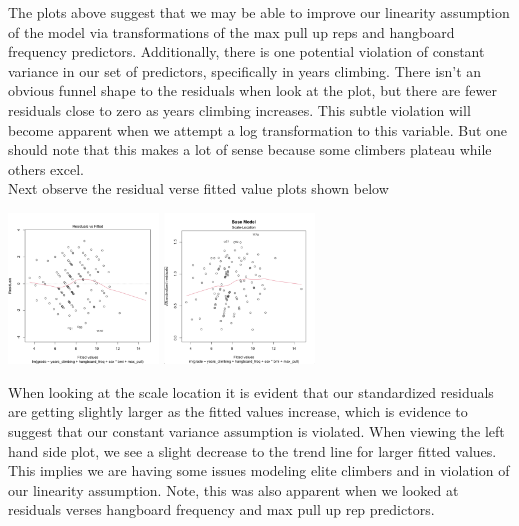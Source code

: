 \documentclass[11pt]{amsart}
\begin{document}
The plots above suggest that we may be able to improve our linearity assumption of the model via transformations of the max pull up reps and hangboard frequency predictors.
Additionally, there is one potential violation of constant variance in our set of predictors, specifically in years climbing.
There isn't an obvious funnel shape to the residuals when look at the plot, but there are fewer residuals close to zero as years climbing increases. This subtle violation will become apparent when we attempt a log transformation to this variable.
But one should note that this makes a lot of sense because some climbers plateau while others excel.\\

Next observe the residual verse fitted value plots shown below\\

\begin{center}
\includegraphics[width=0.3\textwidth]{base_resid_fitted}
\includegraphics[width=0.3\textwidth]{base_scale}
\end{center}

When looking at the scale location it is evident that our standardized residuals are getting slightly larger as the fitted values increase, which is evidence to suggest that our constant variance assumption is violated.
When viewing the left hand side plot, we see a slight decrease to the trend line for larger fitted values.
This implies we are having some issues modeling elite climbers and in violation of our linearity assumption.
Note, this was also apparent when we looked at residuals verses hangboard frequency and max pull up rep predictors.\\
\end{document}
